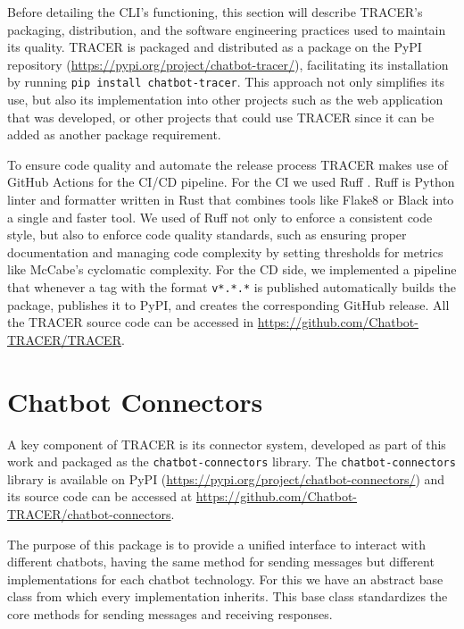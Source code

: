 Before detailing the \ac{CLI}'s functioning,
this section will describe \ac{TRACER}'s packaging, distribution,
and the software engineering practices used to maintain its quality.
\ac{TRACER} is packaged and distributed as a package on the \acf{PyPI} repository
(\url{https://pypi.org/project/chatbot-tracer/}),
facilitating its installation by running
\texttt{pip install chatbot-tracer}.
This approach not only simplifies its use,
but also its implementation into other projects
such as the web application that was developed,
or other projects that could use \ac{TRACER}
since it can be added as another package requirement.

To ensure code quality and automate the release process
\ac{TRACER} makes use of GitHub Actions for the \ac{CI/CD} pipeline.
For the \ac{CI} we used Ruff \autocite{Ruff}.
Ruff is Python linter and formatter written in Rust
that combines tools like Flake8 or Black into a single and faster tool.
We used of Ruff not only to enforce a consistent code style,
but also to enforce code quality standards,
such as ensuring proper documentation
and managing code complexity by setting thresholds for metrics like McCabe's cyclomatic complexity.
For the \ac{CD} side,
we implemented a pipeline that whenever a tag with the format \texttt{v*.*.*} is published
automatically builds the package,
publishes it to \ac{PyPI},
and creates the corresponding GitHub release.
All the \ac{TRACER} source code can be accessed in \url{https://github.com/Chatbot-TRACER/TRACER}.

\section{Chatbot Connectors}

A key component of \ac{TRACER} is its connector system,
developed as part of this work and
packaged as the \texttt{chatbot-connectors} library.
The \texttt{chatbot-connectors} library is available on PyPI
(\url{https://pypi.org/project/chatbot-connectors/})
and its source code can be accessed at
\url{https://github.com/Chatbot-TRACER/chatbot-connectors}.

The purpose of this package is to provide a unified interface
to interact with different chatbots,
having the same method for sending messages
but different implementations for each chatbot technology.
For this we have an abstract base class
from which every implementation inherits.
This base class standardizes the core methods
for sending messages and receiving responses.

